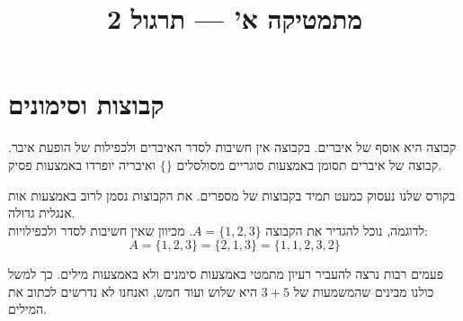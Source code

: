 
\setcounter{secnumdepth}{2}

\title{מתמטיקה א' --- תרגול 2}
\date{}



\maketitle

\section{קבוצות וסימונים}
\begin{definition}[קבוצה]
	קבוצה היא אוסף של איברים. בקבוצה אין חשיבות לסדר האיברים ולכפילות של הופעת איבר. קבוצה של איברים תסומן באמצעות סוגריים מסולסלים $\{\}$ ואיבריה יופרדו באמצעות פסיק.
\end{definition}
\begin{remark}
	בקורס שלנו נעסוק כמעט תמיד בקבוצות של מספרים. את הקבוצות נסמן לרוב באמצעות אות אנגלית גדולה. \\
	לדוגמה, נוכל להגדיר את הקבוצה $A = \{1, 2, 3\}$. מכיוון שאין חשיבות לסדר ולכפילויות:
	\[
		A = \{1, 2, 3\} = \{2, 1, 3\} = \{1, 1, 2, 3, 2\}
	\]
\end{remark}
פעמים רבות נרצה להעביר רעיון מתמטי באמצעות סימנים ולא באמצעות מילים. כך למשל כולנו מבינים שהמשמעות של $3 + 5$ היא שלוש ועוד חמש, ואנחנו לא נדרשים לכתוב את המילים.

